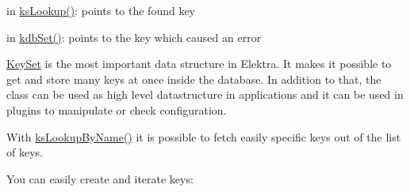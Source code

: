 \begin{DoxyItemize}
\item in \mbox{\hyperlink{group__keyset_gaa34fc43a081e6b01e4120daa6c112004}{ks\+Lookup()}}\+: points to the found key
\item in \mbox{\hyperlink{group__kdb_ga11436b058408f83d303ca5e996832bcf}{kdb\+Set()}}\+: points to the key which caused an error
\end{DoxyItemize}

\mbox{\hyperlink{classkdb_1_1KeySet}{Key\+Set}} is the most important data structure in Elektra. It makes it possible to get and store many keys at once inside the database. In addition to that, the class can be used as high level datastructure in applications and it can be used in plugins to manipulate or check configuration.

With \mbox{\hyperlink{group__keyset_gad2e30fb6d4739d917c5abb2ac2f9c1a1}{ks\+Lookup\+By\+Name()}} it is possible to fetch easily specific keys out of the list of keys.

You can easily create and iterate keys\+:


